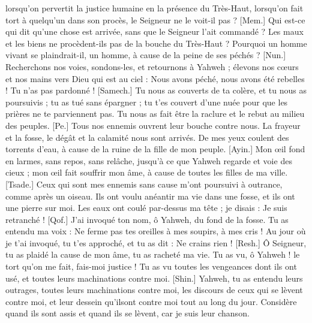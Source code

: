 \begin{multicols}{2}
lorsqu’on pervertit la justice humaine en la présence du Très-Haut,
lorsqu’on fait tort à quelqu’un dans son procès, le Seigneur ne le voit-il pas ?
[Mem.] Qui est-ce qui dit qu'une chose est arrivée, sans que le Seigneur l'ait commandé ?
Les maux et les biens ne procèdent-ils pas de la bouche du Très-Haut ?
Pourquoi un homme vivant se plaindrait-il, un homme, à cause de la peine de ses péchés ?
[Nun.] Recherchons nos voies, sondons-les, et retournons à Yahweh ;
élevons nos cœurs et nos mains vers Dieu qui est au ciel :
Nous avons péché, nous avons été rebelles ! Tu n’as pas pardonné !
[Samech.] Tu nous as couverts de ta colère, et tu nous as poursuivis ; tu as tué sans épargner ;
tu t’es couvert d'une nuée pour que les prières ne te parviennent pas.
Tu nous as fait être la raclure et le rebut au milieu des peuples.
[Pe.] Tous nos ennemis ouvrent leur bouche contre nous.
La frayeur et la fosse, le dégât et la calamité nous sont arrivés.
De mes yeux coulent des torrents d’eau, à cause de la ruine de la fille de mon peuple.
[Ayin.] Mon œil fond en larmes, sans repos, sans relâche,
jusqu’à ce que Yahweh regarde et voie des cieux ;
mon œil fait souffrir mon âme, à cause de toutes les filles de ma ville.
[Tsade.] Ceux qui sont mes ennemis sans cause m’ont poursuivi à outrance, comme après un oiseau.
Ils ont voulu anéantir ma vie dans une fosse, et ils ont une pierre sur moi.
Les eaux ont coulé par-dessus ma tête ; je disais : Je suis retranché !
[Qof.] J’ai invoqué ton nom, ô Yahweh, du fond de la fosse.
Tu as entendu ma voix : Ne ferme pas tes oreilles à mes soupirs, à mes cris !
Au jour où je t’ai invoqué, tu t'es approché, et tu as dit : Ne crains rien !
[Resh.] Ô Seigneur, tu as plaidé la cause de mon âme, tu as racheté ma vie.
Tu as vu, ô Yahweh ! le tort qu’on me fait, fais-moi justice !
Tu as vu toutes les vengeances dont ils ont usé, et toutes leurs machinations contre moi.
[Shin.] Yahweh, tu as entendu leurs outrages, toutes leurs machinations contre moi,
les discours de ceux qui se lèvent contre moi, et leur dessein qu'ilsont contre moi tout au long du jour.
Considère quand ils sont assis et quand ils se lèvent, car je suis leur chanson.

\end{multicols}
